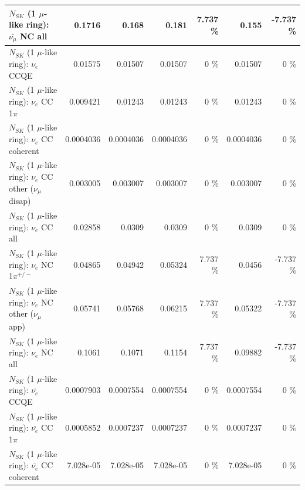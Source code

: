 \begin{table}
\begin{tabular}{| l | r | r | r  r | r  r |}
                          $N_{SK}$ (1 $\mu$-like ring): $\bar{\nu_{\mu}}$ NC all &          0.1716 &           0.168 &           0.181 &    7.737 \%  &           0.155 &   -7.737 \%  \\ 
\hline
\hline
\hline
                                      $N_{SK}$ (1 $\mu$-like ring): $\nu_e$ CCQE &         0.01575 &         0.01507 &         0.01507 &        0 \%  &         0.01507 &        0 \%  \\ 
                                 $N_{SK}$ (1 $\mu$-like ring): $\nu_e$ CC 1$\pi$ &        0.009421 &         0.01243 &         0.01243 &        0 \%  &         0.01243 &        0 \%  \\ 
                               $N_{SK}$ (1 $\mu$-like ring): $\nu_e$ CC coherent &       0.0004036 &       0.0004036 &       0.0004036 &        0 \%  &       0.0004036 &        0 \%  \\ 
                $N_{SK}$ (1 $\mu$-like ring): $\nu_e$ CC other ($\nu_\mu$ disap) &        0.003005 &        0.003007 &        0.003007 &        0 \%  &        0.003007 &        0 \%  \\ 
                                  $N_{SK}$ (1 $\mu$-like ring): $\nu_{e}$ CC all &         0.02858 &          0.0309 &          0.0309 &        0 \%  &          0.0309 &        0 \%  \\ 
\hline
                           $N_{SK}$ (1 $\mu$-like ring): $\nu_e$ NC 1$\pi^{+/-}$ &         0.04865 &         0.04942 &         0.05324 &    7.737 \%  &          0.0456 &   -7.737 \%  \\ 
                  $N_{SK}$ (1 $\mu$-like ring): $\nu_e$ NC other ($\nu_\mu$ app) &         0.05741 &         0.05768 &         0.06215 &    7.737 \%  &         0.05322 &   -7.737 \%  \\ 
                                  $N_{SK}$ (1 $\mu$-like ring): $\nu_{e}$ NC all &          0.1061 &          0.1071 &          0.1154 &    7.737 \%  &         0.09882 &   -7.737 \%  \\ 
\hline
\hline
\hline
                                $N_{SK}$ (1 $\mu$-like ring): $\bar{\nu_e}$ CCQE &       0.0007903 &       0.0007554 &       0.0007554 &        0 \%  &       0.0007554 &        0 \%  \\ 
                           $N_{SK}$ (1 $\mu$-like ring): $\bar{\nu_e}$ CC 1$\pi$ &       0.0005852 &       0.0007237 &       0.0007237 &        0 \%  &       0.0007237 &        0 \%  \\ 
                         $N_{SK}$ (1 $\mu$-like ring): $\bar{\nu_e}$ CC coherent &       7.028e-05 &       7.028e-05 &       7.028e-05 &        0 \%  &       7.028e-05 &        0 \%  \\ 

\end{tabular}
\end{table}
